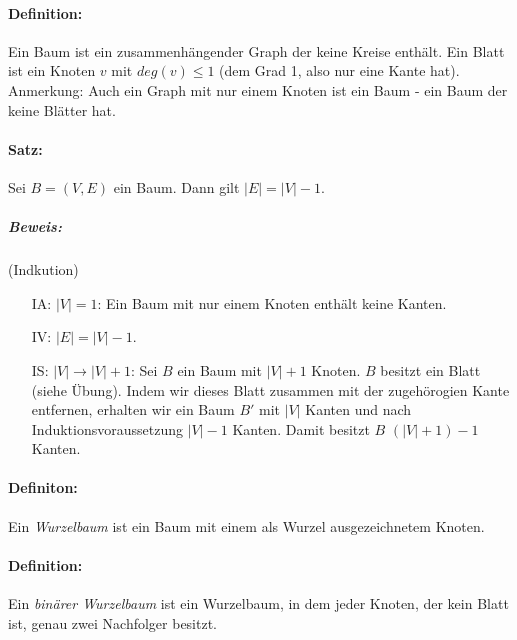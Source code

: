 \documentclass{scrreprt}
\begin{document}
\paragraph{Definition:} Ein Baum ist ein zusammenhängender Graph der keine Kreise enthält. Ein Blatt ist ein Knoten $v$ mit $deg(v)\leq 1$ (dem Grad 1, also nur eine Kante hat).\\
Anmerkung: Auch ein Graph mit nur einem Knoten ist ein Baum - ein Baum der keine Blätter hat.

\paragraph{Satz:} Sei $B=(V,E)$ ein Baum. Dann gilt $|E|=|V|-1$.

\subparagraph{Beweis:} (Indkution)
\begin{itemize}
\item[IA:] $|V|=1$: Ein Baum mit nur einem Knoten enthält keine Kanten.
\item[IV:] $|E|=|V|-1$.
\item[IS:]$|V| \rightarrow |V| +1$: Sei $B$ ein Baum mit $|V|+1$ Knoten. $B$ besitzt ein Blatt (siehe Übung). Indem wir dieses Blatt zusammen mit der zugehörogien Kante entfernen, erhalten wir ein Baum $B'$ mit $|V|$ Kanten und nach Induktionsvoraussetzung $|V|-1$ Kanten. Damit besitzt $B$ $(|V|+1)-1$ Kanten.
\end{itemize}

\paragraph{Definiton:} Ein \emph{Wurzelbaum} ist ein Baum mit einem als Wurzel ausgezeichnetem Knoten.

\paragraph{Definition:} Ein \emph{binärer Wurzelbaum} ist ein Wurzelbaum, in dem jeder Knoten, der kein Blatt ist, genau zwei Nachfolger besitzt.\\
\end{document}
